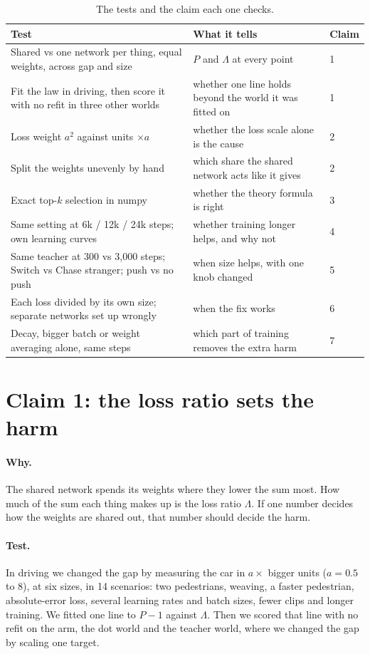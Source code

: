 \documentclass[11pt]{article}
\newcommand{\Lam}{\Lambda}
\newcommand{\para}[1]{\paragraph{#1}}
\begin{document}
\begin{table}[h]
\centering\small
\caption{The tests and the claim each one checks.}
\label{tab:tests}
\begin{tabularx}{\linewidth}{@{}YYl@{}}
\toprule
Test & What it tells & Claim \\
\midrule
Shared vs one network per thing, equal weights, across gap and size & $P$ and $\Lam$ at every point & 1 \\
Fit the law in driving, then score it with no refit in three other worlds & whether one line holds beyond the world it was fitted on & 1 \\
Loss weight $a^2$ against units $\times a$ & whether the loss scale alone is the cause & 2 \\
Split the weights unevenly by hand & which share the shared network acts like it gives & 2 \\
Exact top-$k$ selection in numpy & whether the theory formula is right & 3 \\
Same setting at 6k / 12k / 24k steps; own learning curves & whether training longer helps, and why not & 4 \\
Same teacher at 300 vs 3,000 steps; Switch vs Chase stranger; push vs no push & when size helps, with one knob changed & 5 \\
Each loss divided by its own size; separate networks set up wrongly & when the fix works & 6 \\
Decay, bigger batch or weight averaging alone, same steps & which part of training removes the extra harm & 7 \\
\bottomrule
\end{tabularx}
\end{table}

\section{Claim 1: the loss ratio sets the harm}
\label{sec:ratio}

\para{Why.} The shared network spends its weights where they lower the sum most. How much of the sum each thing makes up is the loss ratio $\Lam$. If one number decides how the weights are shared out, that number should decide the harm.

\para{Test.} In driving we changed the gap by measuring the car in $a\times$ bigger units ($a=0.5$ to 8), at six sizes, in 14 scenarios: two pedestrians, weaving, a faster pedestrian, absolute-error loss, several learning rates and batch sizes, fewer clips and longer training. We fitted one line to $P-1$ against $\Lam$. Then we scored that line with no refit on the arm, the dot world and the teacher world, where we changed the gap by scaling one target.
\end{document}
